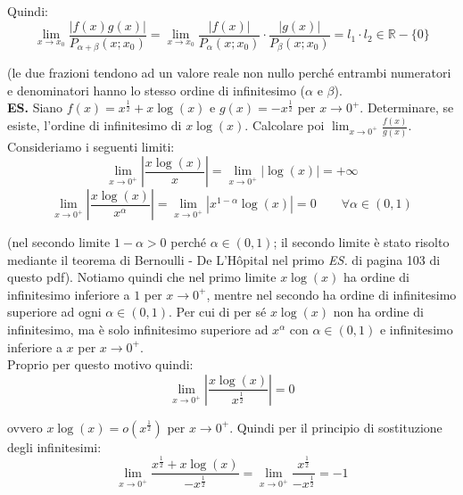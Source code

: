 \documentclass{article}
\begin{document}
\noindent Quindi:
\begin{equation*}
\lim_{x \to x_0} \frac{|f(x)g(x)|}{P_{\alpha + \beta}(x;x_0)} = \lim_{x \to x_0} \frac{|f(x)|}{P_\alpha(x; x_0)} \cdot \frac{|g(x)|}{P_\beta(x; x_0)} = l_1 \cdot l_2 \in \mathbb{R} - \{0\}
\end{equation*}

\noindent (le due frazioni tendono ad un valore reale non nullo perché entrambi numeratori e denominatori hanno lo stesso ordine di infinitesimo ($\alpha$ e $\beta$).\\

\noindent\textbf{ES.} Siano $f(x) = x^\frac{1}{2} + x\log(x)$ e $g(x) = - x^\frac{1}{2}$ per $x \to 0^+$. Determinare, se esiste, l'ordine di infinitesimo di $x\log(x)$. Calcolare poi $\lim_{x \to 0^+} \frac{f(x)}{g(x)}$.\\
Consideriamo i seguenti limiti:
\begin{equation*}
    \lim_{x \to 0^+} \left|\frac{x\log(x)}{x}\right| = \lim_{x \to 0^+} |\log(x)| = +\infty
\end{equation*}
\begin{equation*}
    \lim_{x \to 0^+} \left|\frac{x\log(x)}{x^\alpha}\right| = \lim_{x \to 0^+} |x^{1 - \alpha}\log(x)| = 0 \qquad \forall \alpha \in (0, 1)
\end{equation*}

\noindent (nel secondo limite $1 - \alpha > 0$ perché $\alpha \in (0, 1)$; il secondo limite è stato risolto mediante il teorema di Bernoulli - De L'Hôpital nel primo \textit{ES.} di pagina 103 di questo pdf). Notiamo quindi che nel primo limite $x\log(x)$ ha ordine di infinitesimo inferiore a $1$ per $x \to 0^+$, mentre nel secondo ha ordine di infinitesimo superiore ad ogni $\alpha \in (0, 1)$. Per cui di per sé $x\log(x)$ non ha ordine di infinitesimo, ma è solo infinitesimo superiore ad $x^\alpha$ con $\alpha \in (0, 1)$ e infinitesimo inferiore a $x$ per $x \to 0^+$.\\
Proprio per questo motivo quindi:
\begin{equation*}
    \lim_{x \to 0^+} \left|\frac{x\log(x)}{x^\frac{1}{2}}\right| = 0
\end{equation*}

\noindent ovvero $x\log(x) = o(x^\frac{1}{2})$ per $x \to 0^+$. Quindi per il principio di sostituzione degli infinitesimi:
\begin{equation*}
    \lim_{x \to 0^+} \frac{x^\frac{1}{2} + x\log(x)}{-x^\frac{1}{2}} = \lim_{x \to 0^+} \frac{x^\frac{1}{2}}{-x^\frac{1}{2}} = -1
\end{equation*}
\end{document}
